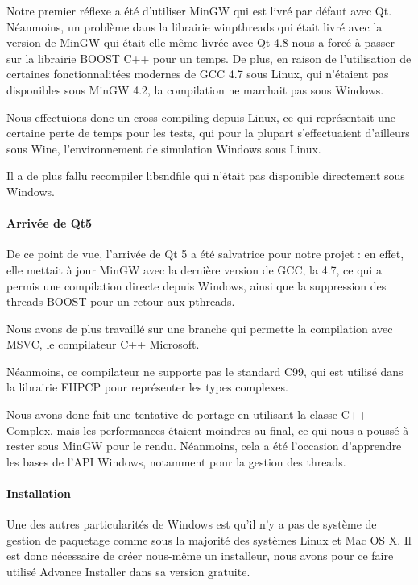 Notre premier réflexe a été d'utiliser MinGW qui est livré par défaut avec Qt. Néanmoins, un problème
dans la librairie winpthreads qui était livré avec la version de MinGW qui était elle-même livrée avec Qt 4.8 nous a
forcé à passer sur la librairie BOOST C++ pour un temps. De plus, en raison de l'utilisation de certaines fonctionnalitées modernes
de \ac{GCC} 4.7 sous Linux, qui n'étaient pas disponibles sous MinGW 4.2, la compilation ne marchait pas sous Windows.

Nous effectuions donc un cross-compiling depuis Linux, ce qui représentait une certaine perte de temps pour les tests,
qui pour la plupart s'effectuaient d'ailleurs sous Wine, l'environnement de simulation Windows sous Linux.

Il a de plus fallu recompiler libsndfile qui n'était pas disponible directement sous Windows.

\paragraph{Arrivée de Qt5}
De ce point de vue, l'arrivée de Qt 5 a été salvatrice pour notre projet : en effet, elle mettait à jour MinGW
avec la dernière version de \ac{GCC}, la 4.7, ce qui a permis une compilation directe depuis Windows, ainsi que la suppression des
threads BOOST pour un retour aux pthreads.

Nous avons de plus travaillé sur une branche qui permette la compilation avec \ac{MSVC}, le compilateur C++ Microsoft.

Néanmoins, ce compilateur ne supporte pas le standard C99, qui est utilisé dans la librairie EHPCP pour représenter les types complexes.

Nous avons donc fait une tentative de portage en utilisant la classe C++ Complex, mais les performances étaient moindres au final,
ce qui nous a poussé à rester sous MinGW pour le rendu. Néanmoins, cela a été l'occasion d'apprendre les
bases de l'API Windows, notamment pour la gestion des threads.

\paragraph{Installation}
Une des autres particularités de Windows est qu'il n'y a pas de système de gestion de paquetage comme sous la majorité des systèmes Linux et Mac OS X.
Il est donc nécessaire de créer nous-même un installeur, nous avons pour ce faire utilisé Advance Installer dans sa version gratuite.

